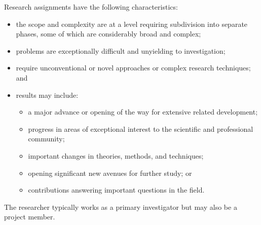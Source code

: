 Research assignments have the following characteristics:
\begin{itemize}
  \item  the scope and complexity are at a level requiring subdivision into separate phases, some of  which are considerably broad and complex; 
  \item problems are exceptionally difficult and unyielding to investigation; 
  \item require unconventional or novel approaches or complex research techniques; and 
  \item results may include:
  \begin{itemize}
    \item a major advance or opening of the way for extensive related development; 
    \item progress in areas of exceptional interest to the scientific and professional community; 
    \item important changes in theories, methods, and techniques; 
    \item opening significant new avenues for further study; or 
    \item contributions answering important questions in the field.
  \end{itemize}
\end{itemize} 

\noindent The researcher typically works as a primary investigator but may also be a project member.

